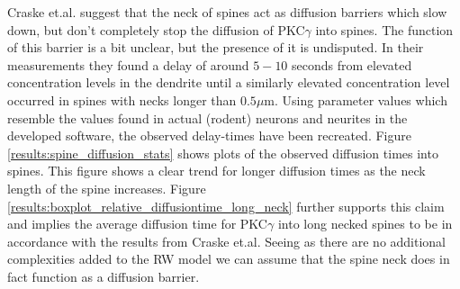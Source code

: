 Craske et.al. \cite{craske2005spines} suggest that the neck of spines act as diffusion barriers which slow down, but don't completely stop the diffusion of PKC$\gamma$ into spines. 
The function of this barrier is a bit unclear, but the presence of it is undisputed. 
In their measurements they found a delay of around $5-10$ seconds from elevated concentration levels in the dendrite until a similarly elevated concentration level occurred in spines with necks longer than $0.5\mu$m. 
Using parameter values which resemble the values found in actual (rodent) neurons and neurites in the developed software, the observed delay-times have been recreated. 
Figure \ref{results:spine_diffusion_stats} shows plots of the observed diffusion times into spines. 
This figure shows a clear trend for longer diffusion times as the neck length of the spine increases. 
Figure \ref{results:boxplot_relative_diffusiontime_long_neck} further supports this claim and implies the average diffusion time for PKC$\gamma$ into long necked spines to be in accordance with the results from Craske et.al.
Seeing as there are no additional complexities added to the RW model we can assume that the spine neck does in fact function as a diffusion barrier.

